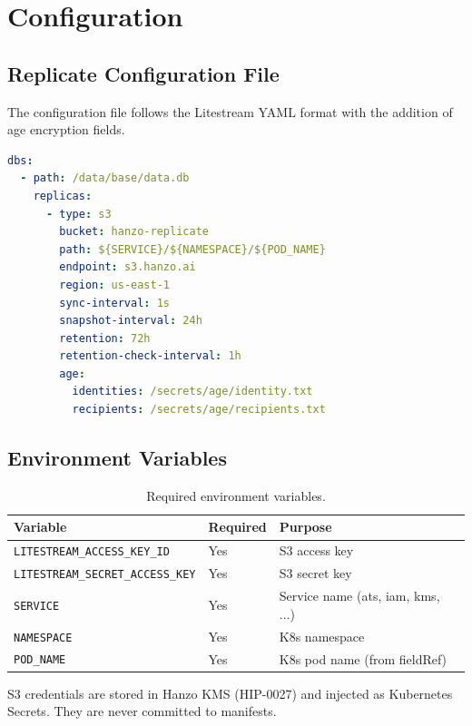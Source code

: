 \section{Configuration}


\subsection{Replicate Configuration File}

The configuration file follows the Litestream YAML format with the addition
of age encryption fields.

\begin{lstlisting}[language=YAML,caption={replicate.yml --- canonical configuration.}]
dbs:
  - path: /data/base/data.db
    replicas:
      - type: s3
        bucket: hanzo-replicate
        path: ${SERVICE}/${NAMESPACE}/${POD_NAME}
        endpoint: s3.hanzo.ai
        region: us-east-1
        sync-interval: 1s
        snapshot-interval: 24h
        retention: 72h
        retention-check-interval: 1h
        age:
          identities: /secrets/age/identity.txt
          recipients: /secrets/age/recipients.txt
\end{lstlisting}

\subsection{Environment Variables}

\begin{table}[H]
\centering
\begin{tabular}{@{}lll@{}}
\toprule
\textbf{Variable} & \textbf{Required} & \textbf{Purpose} \\
\midrule
\texttt{LITESTREAM\_ACCESS\_KEY\_ID}     & Yes & S3 access key \\
\texttt{LITESTREAM\_SECRET\_ACCESS\_KEY} & Yes & S3 secret key \\
\texttt{SERVICE}                          & Yes & Service name (ats, iam, kms, ...) \\
\texttt{NAMESPACE}                        & Yes & K8s namespace \\
\texttt{POD\_NAME}                        & Yes & K8s pod name (from fieldRef) \\
\bottomrule
\end{tabular}
\caption{Required environment variables.}
\label{tab:env}
\end{table}

S3 credentials are stored in Hanzo KMS (HIP-0027) and injected as
Kubernetes Secrets. They are never committed to manifests.

